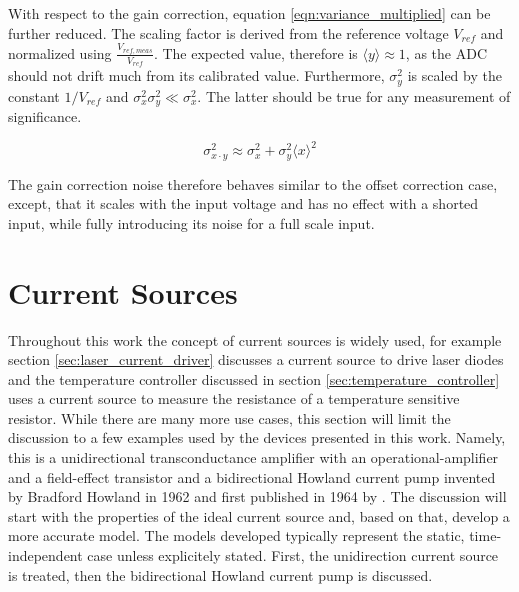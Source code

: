 With respect to the gain correction, equation \ref{eqn:variance_multiplied} can be further reduced. The scaling factor is derived from the reference voltage $V_{ref}$ and normalized using $\frac{V_{ref, meas}}{V_{ref}}$. The expected value, therefore is $\langle y \rangle \approx 1$, as the ADC should not drift much from its calibrated value. Furthermore, $\sigma_y^2$ is scaled by the constant $1/V_{ref}$ and $\sigma_x^2 \sigma_y^2 \ll \sigma_x^2$. The latter should be true for any measurement of significance.

\begin{equation}
    \sigma_{x \cdot y}^2 \approx \sigma_x^2 + \sigma_y^2 \langle x \rangle^2
\end{equation}

The gain correction noise therefore behaves similar to the offset correction case, except, that it scales with the input voltage and has no effect with a shorted input, while fully introducing its noise for a full scale input.



\clearpage
\section{Current Sources}
Throughout this work the concept of current sources is widely used, for example section \ref{sec:laser_current_driver} discusses a current source to drive laser diodes and the temperature controller discussed in section \ref{sec:temperature_controller} uses a current source to measure the resistance of a temperature sensitive resistor. While there are many more use cases, this section will limit the discussion to a few examples used by the devices presented in this work. Namely, this is a unidirectional transconductance amplifier with an operational-amplifier and a field-effect transistor and a bidirectional Howland current pump invented by Bradford Howland in 1962 and first published in 1964 by \citeauthor{howland_current_source} \cite{howland_current_source}. The discussion will start with the properties of the ideal current source and, based on that, develop a more accurate model. The models developed typically represent the static, time-independent case unless explicitely stated. First, the unidirection current source is treated, then the bidirectional Howland current pump is discussed.

